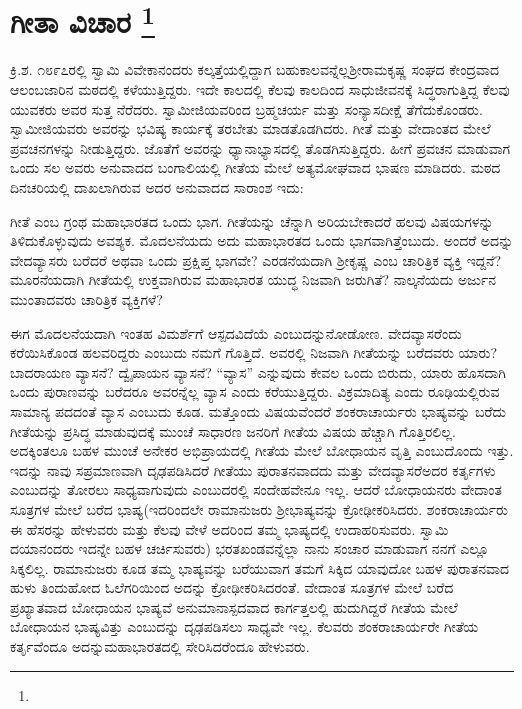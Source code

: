 
\chapter[ಗೀತಾ ವಿಚಾರ ]{ಗೀತಾ ವಿಚಾರ \protect\footnote{}}

ಕ್ರಿ.ಶ. ೧೮೯೭ರಲ್ಲಿ ಸ್ವಾಮಿ ವಿವೇಕಾನಂದರು ಕಲ್ಕತ್ತೆಯಲ್ಲಿದ್ದಾಗ ಬಹುಕಾಲವನ್ನೆಲ್ಲ\break ಶ‍್ರೀರಾಮಕೃಷ್ಣ ಸಂಘದ ಕೇಂದ್ರವಾದ ಆಲಂಬಜಾರಿನ ಮಠದಲ್ಲಿ ಕಳೆಯುತ್ತಿದ್ದರು. ಇದೇ ಕಾಲದಲ್ಲಿ ಕೆಲವು ಕಾಲದಿಂದ ಸಾಧುಜೀವನಕ್ಕೆ ಸಿದ್ಧರಾಗುತ್ತಿದ್ದ ಕೆಲವು ಯುವಕರು ಅವರ ಸುತ್ತ ನೆರೆದರು. ಸ್ವಾಮೀಜಿಯವರಿಂದ ಬ್ರಹ್ಮಚರ್ಯ ಮತ್ತು ಸಂನ್ಯಾಸದೀಕ್ಷೆ ತೆಗೆದು\-ಕೊಂಡರು. ಸ್ವಾಮೀಜಿಯವರು ಅವರನ್ನು ಭವಿಷ್ಯ ಕಾರ್ಯಕ್ಕೆ ತರಬೇತು ಮಾಡತೊಡಗಿದರು. ಗೀತೆ ಮತ್ತು ವೇದಾಂತದ ಮೇಲೆ ಪ್ರವಚನಗಳನ್ನು ನೀಡುತ್ತಿದ್ದರು. ಜೊತೆಗೆ ಅವರನ್ನು ಧ್ಯಾನಾಭ್ಯಾಸದಲ್ಲಿ ತೊಡಗಿಸುತ್ತಿದ್ದರು. ಹೀಗೆ ಪ್ರವಚನ ಮಾಡುವಾಗ ಒಂದು ಸಲ ಅವರು ಅನುವಾದದ ಬಂಗಾಲಿಯಲ್ಲಿ ಗೀತೆಯ ಮೇಲೆ ಅತ್ಯಮೋಘವಾದ ಭಾಷಣ ಮಾಡಿದರು. ಮಠದ ದಿನಚರಿಯಲ್ಲಿ ದಾಖಲಾಗಿರುವ ಅದರ ಅನುವಾದದ ಸಾರಾಂಶ ಇದು:

ಗೀತೆ ಎಂಬ ಗ್ರಂಥ ಮಹಾಭಾರತದ ಒಂದು ಭಾಗ. ಗೀತೆಯನ್ನು ಚೆನ್ನಾಗಿ ಅರಿಯಬೇಕಾದರೆ ಹಲವು ವಿಷಯಗಳನ್ನು ತಿಳಿದುಕೊಳ್ಳುವುದು ಅವಶ್ಯಕ. ಮೊದಲನೆಯದು ಅದು ಮಹಾಭಾರತದ ಒಂದು ಭಾಗವಾಗಿತ್ತೆಂಬುದು. ಅಂದರೆ ಅದನ್ನು ವೇದವ್ಯಾಸರು ಬರೆದರೆ ಅಥವಾ ಒಂದು ಪ್ರಕ್ಷಿಪ್ತ ಭಾಗವೇ? ಎರಡನೆಯದಾಗಿ ಶ‍್ರೀಕೃಷ್ಣ ಎಂಬ ಚಾರಿತ್ರಿಕ ವ್ಯಕ್ತಿ ಇದ್ದನೆ? ಮೂರನೆಯದಾಗಿ ಗೀತೆಯಲ್ಲಿ ಉಕ್ತವಾಗಿರುವ ಮಹಾಭಾರತ ಯುದ್ಧ ನಿಜವಾಗಿ ಜರುಗಿತೆ? ನಾಲ್ಕನೆಯದು ಅರ್ಜುನ ಮುಂತಾದವರು ಚಾರಿತ್ರಿಕ ವ್ಯಕ್ತಿಗಳೆ?

ಈಗ ಮೊದಲನೆಯದಾಗಿ ಇಂತಹ ವಿಮರ್ಶೆಗೆ ಆಸ್ಪದವಿದೆಯೆ ಎಂಬುದನ್ನು\break ನೋಡೋಣ. ವೇದವ್ಯಾಸರೆಂದು ಕರೆಯಿಸಿಕೊಂಡ ಹಲವರಿದ್ದರು ಎಂಬುದು ನಮಗೆ ಗೊತ್ತಿದೆ. ಅವರಲ್ಲಿ ನಿಜವಾಗಿ ಗೀತೆಯನ್ನು ಬರೆದವರು ಯಾರು? ಬಾದರಾಯಣ ವ್ಯಾಸನೆ? ದ್ವೈಪಾಯನ ವ್ಯಾಸನೆ? “ವ್ಯಾಸ” ಎನ್ನುವುದು ಕೇವಲ ಒಂದು ಬಿರುದು, ಯಾರು ಹೊಸದಾಗಿ ಒಂದು ಪುರಾಣವನ್ನು ಬರೆದರೂ ಅವರನ್ನೆಲ್ಲ ವ್ಯಾಸ ಎಂದು ಕರೆಯು\-ತ್ತಿದ್ದರು. ವಿಕ್ರಮಾದಿತ್ಯ ಎಂದು ರೂಢಿಯಲ್ಲಿರುವ ಸಾಮಾನ್ಯ ಪದದಂತೆ ವ್ಯಾಸ ಎಂಬುದು ಕೂಡ. ಮತ್ತೊಂದು ವಿಷಯವೆಂದರೆ ಶಂಕರಾಚಾರ್ಯರು ಭಾಷ್ಯವನ್ನು ಬರೆದು ಗೀತೆಯನ್ನು ಪ್ರಸಿದ್ಧ ಮಾಡುವುದಕ್ಕೆ ಮುಂಚೆ ಸಾಧಾರಣ ಜನರಿಗೆ ಗೀತೆಯ ವಿಷಯ ಹೆಚ್ಚಾಗಿ ಗೊತ್ತಿರಲಿಲ್ಲ. ಅದಕ್ಕಿಂತಲೂ ಬಹಳ ಮುಂಚೆ ಅನೇಕರ ಅಭಿಪ್ರಾಯದಲ್ಲಿ ಗೀತೆಯ ಮೇಲೆ ಬೋಧಾಯನ ವೃತ್ತಿ ಎಂಬುದೊಂದು ಇತ್ತು. ಇದನ್ನು ನಾವು ಸಪ್ರಮಾಣವಾಗಿ ದೃಢಪಡಿಸಿದರೆ ಗೀತೆಯು ಪುರಾತನವಾದದು ಮತ್ತು ವೇದವ್ಯಾಸರೆ\break ಅದರ ಕರ್ತೃಗಳು ಎಂಬುದನ್ನು ತೋರಲು ಸಾಧ್ಯವಾಗುವುದು ಎಂಬುದರಲ್ಲಿ ಸಂದೇಹವೇನೂ ಇಲ್ಲ. ಆದರೆ ಬೋಧಾಯನರು ವೇದಾಂತ ಸೂತ್ರಗಳ ಮೇಲೆ ಬರೆದ ಭಾಷ್ಯ\break (ಇದರಿಂದಲೇ ರಾಮಾನುಜರು ಶ‍್ರೀಭಾಷ್ಯವನ್ನು ಕ್ರೋಢೀಕರಿಸಿದರು. ಶಂಕರಾಚಾರ್ಯರು ಈ ಹೆಸರನ್ನು ಹೇಳುವರು ಮತ್ತು ಕೆಲವು ವೇಳೆ ಅದರಿಂದ ತಮ್ಮ ಭಾಷ್ಯದಲ್ಲಿ ಉದಾಹರಿಸು\-ವರು. ಸ್ವಾಮಿ ದಯಾನಂದರು ಇದನ್ನೇ ಬಹಳ ಚರ್ಚಿಸುವರು) ಭರತಖಂಡವನ್ನೆಲ್ಲಾ ನಾನು ಸಂಚಾರ ಮಾಡುವಾಗ ನನಗೆ ಎಲ್ಲೂ ಸಿಕ್ಕಲಿಲ್ಲ. ರಾಮಾನುಜರು ಕೂಡ ತಮ್ಮ ಭಾಷ್ಯವನ್ನು ಬರೆಯುವಾಗ ತಮಗೆ ಸಿಕ್ಕಿದ ಯಾವುದೋ ಬಹಳ ಪುರಾತನವಾದ ಹುಳು ತಿಂದುಹೋದ ಓಲೆಗರಿಯಿಂದ ಅದನ್ನು ಕ್ರೋಢೀಕರಿಸಿದರಂತೆ. ವೇದಾಂತ ಸೂತ್ರಗಳ ಮೇಲೆ ಬರೆದ ಪ್ರಖ್ಯಾತವಾದ ಬೋಧಾಯನ ಭಾಷ್ಯವೆ ಅನುಮಾನಾಸ್ಪದವಾದ ಕಾರ್ಗತ್ತಲಲ್ಲಿ ಹುದುಗಿದ್ದರೆ ಗೀತೆಯ ಮೇಲೆ ಬೋಧಾಯನ ಭಾಷ್ಯವಿತ್ತು ಎಂಬುದನ್ನು ದೃಢಪಡಿಸಲು ಸಾಧ್ಯವೇ ಇಲ್ಲ. ಕೆಲವರು ಶಂಕರಾಚಾರ್ಯರೇ ಗೀತೆಯ ಕರ್ತೃವೆಂದೂ ಅದನ್ನು\break ಮಹಾಭಾರತದಲ್ಲಿ ಸೇರಿಸಿದರೆಂದೂ ಹೇಳುವರು.

